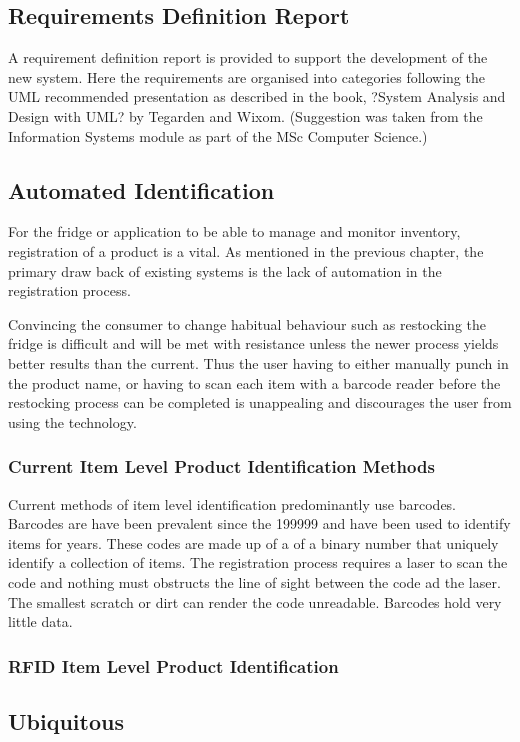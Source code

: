 \documentclass[a4paper, 11pt]{article}
\begin{document}
\subsection{Requirements Definition Report}
A requirement definition report is provided to support the development of the new system. Here the requirements are organised into categories following the UML recommended presentation as described in the book, ?System Analysis and Design with UML? by Tegarden and Wixom. (Suggestion was taken from the Information Systems module as part of the MSc Computer Science.)

\subsection{Automated Identification}
For the fridge or application to be able to manage and monitor inventory, registration of a product is a vital. As mentioned in the previous chapter, the primary draw back of existing systems is the lack of automation in the registration process.

Convincing the consumer to change habitual behaviour such as restocking the fridge is difficult and will be met with resistance unless the newer process yields better results than the current. Thus the user having to either manually punch in the product name, or having to scan each item with a barcode reader before the restocking process can be completed is unappealing and discourages the user from using the technology. 

\subsubsection{Current Item Level Product Identification Methods} 
Current methods of item level identification predominantly use barcodes. Barcodes are have been prevalent since the 199999 and have been used to identify items for years. These codes are made up of a of a binary number that uniquely identify a collection of items. The registration process requires a laser to scan the code and nothing must obstructs the line of sight between the code ad the laser. The smallest scratch or dirt can render the code unreadable.  Barcodes hold very little data. 

\subsubsection{RFID Item Level Product Identification}


\subsection{Ubiquitous}
\end{document}
